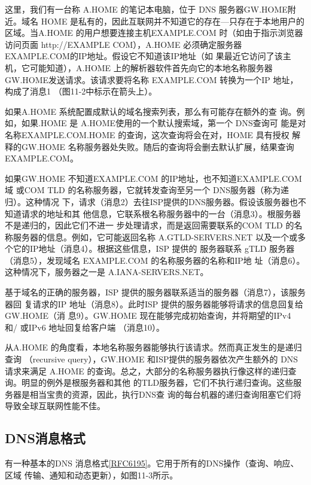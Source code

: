这里，我们有一台称 A.HOME 的笔记本电脑，位于 DNS 服务器GW.HOME附近。域名
HOME 是私有的，因此互联网并不知道它的存在—只存在于本地用户的区域。当A.HOME
的用户想要连接主机EXAMPLE.COM 时（如由于指示浏览器访问页面 http://EXAMPLE
COM），A.HOME 必须确定服务器EXAMPLE.COM的IP地址。假设它不知道该IP地址（如
果最近它访问了该主机，它可能知道），A.HOME 上的解析器软件首先向它的本地名称服务器
GW.HOME发送请求。该请求要将名称 EXAMPLE.COM 转换为一个IP 地址，构成了消息1
（图11-2中标示在箭头上）。

\begin{tcolorbox}
    如果A.HOME 系统配置成默认的域名搜索列表，那么有可能存在额外的查
    询。例如，如果.HOME 是 A.HOME使用的一个默认搜索域，第一个 DNS查询可
    能是对名称EXAMPLE.COM.HOME 的查询，这次查询将会在对，HOME 具有授权
    解释的GW.HOME 名称服务器处失败。随后的查询将会删去默认扩展，结果查询
    EXAMPLE.COM。
\end{tcolorbox}

如果GW.HOME 不知道EXAMPLE.COM 的IP地址，也不知道EXAMPLE.COM域
或COM TLD 的名称服务器，它就转发查询至另一个 DNS服务器（称为递归）。这种情况
下，请求（消息2）去往ISP提供的DNS服务器。假设该服务器也不知道请求的地址和其
他信息，它联系根名称服务器中的一台（消息3）。根服务器不是递归的，因此它们不进一
步处理请求，而是返回需要联系的COM TLD 的名称服务器的信息。例如，它可能返回名称
A.GTLD-SERVERS.NET 以及一个或多个它的IP地址（消息4）。根据这些信息，ISP 提供的
服务器联系 gTLD 服务器（消息5），发现域名 EXAMPLE.COM 的名称服务器的名称和IP地
址（消息6）。这种情况下，服务器之一是 A.IANA-SERVERS.NET。

基于域名的正确的服务器，ISP 提供的服务器联系适当的服务器（消息7），该服务器回
复请求的IP 地址（消息8）。此时ISP 提供的服务器能够将请求的信息回复给GW.HOME（消
息9）。GW.HOME 现在能够完成初始查询，并将期望的IPv4 和/ 或IPv6 地址回复给客户端
（消息10）。

从A.HOME 的角度看，本地名称服务器能够执行该请求。然而真正发生的是递归查询
（recursive query），GW.HOME 和ISP提供的服务器依次产生额外的 DNS 请求来满足 A.HOME
的查询。总之，大部分的名称服务器执行像这样的递归查询。明显的例外是根服务器和其他
的TLD服务器，它们不执行递归查询。这些服务器是相当宝贵的资源，因此，执行DNS查
询的每台机器的递归查询阻塞它们将导致全球互联网性能不佳。

\subsection{DNS消息格式}

有一种基本的DNS 消息格式\href{https://www.rfc-editor.org/rfc/rfc6195}{[RFC6195]}。它用于所有的DNS操作（查询、响应、区域
传输、通知和动态更新），如图11-3所示。

